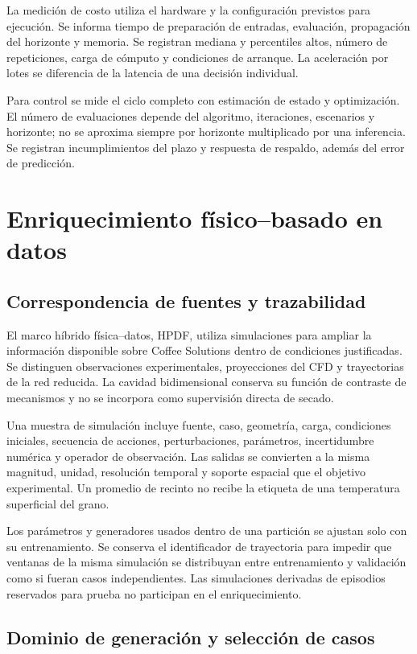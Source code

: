 La medición de costo utiliza el hardware y la configuración previstos para ejecución. Se informa tiempo de preparación de entradas, evaluación, propagación del horizonte y memoria. Se registran mediana y percentiles altos, número de repeticiones, carga de cómputo y condiciones de arranque. La aceleración por lotes se diferencia de la latencia de una decisión individual.

Para control se mide el ciclo completo con estimación de estado y optimización. El número de evaluaciones depende del algoritmo, iteraciones, escenarios y horizonte; no se aproxima siempre por horizonte multiplicado por una inferencia. Se registran incumplimientos del plazo y respuesta de respaldo, además del error de predicción.

\section{Enriquecimiento físico--basado en datos}
\label{met:hpdf}

\subsection{Correspondencia de fuentes y trazabilidad}

El marco híbrido física--datos, HPDF, utiliza simulaciones para ampliar la información disponible sobre Coffee Solutions dentro de condiciones justificadas. Se distinguen observaciones experimentales, proyecciones del CFD y trayectorias de la red reducida. La cavidad bidimensional conserva su función de contraste de mecanismos y no se incorpora como supervisión directa de secado.

Una muestra de simulación incluye fuente, caso, geometría, carga, condiciones iniciales, secuencia de acciones, perturbaciones, parámetros, incertidumbre numérica y operador de observación. Las salidas se convierten a la misma magnitud, unidad, resolución temporal y soporte espacial que el objetivo experimental. Un promedio de recinto no recibe la etiqueta de una temperatura superficial del grano.

Los parámetros y generadores usados dentro de una partición se ajustan solo con su entrenamiento. Se conserva el identificador de trayectoria para impedir que ventanas de la misma simulación se distribuyan entre entrenamiento y validación como si fueran casos independientes. Las simulaciones derivadas de episodios reservados para prueba no participan en el enriquecimiento.

\subsection{Dominio de generación y selección de casos}

